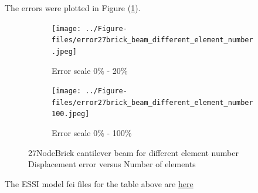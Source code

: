 \documentclass[fleqn,11pt]{article}
\begin{document}
The errors were plotted in Figure (\ref{fig error 27NodeBrick cantilever beam for different element number}).

\begin{figure}[H]
  \begin{subfigure}{0.5\textwidth}
    \centering
    \texttt{[image: ../Figure-files/error27brick\_beam\_different\_element\_number.jpeg]}
    \caption{Error scale 0\% - 20\%}
  \end{subfigure}
  \begin{subfigure}{0.5\textwidth}
    \centering
    \texttt{[image: ../Figure-files/error27brick\_beam\_different\_element\_number100.jpeg]}
    \caption{Error scale 0\% - 100\%}
  \end{subfigure}
  \captionsetup{justification=centering,margin=2cm}
  \caption{27NodeBrick cantilever beam for different element number\\
    Displacement error   versus   Number of elements}
  \label{fig error 27NodeBrick cantilever beam for different element number}
\end{figure}


The ESSI model fei files for the table above are \href{https://github.com/yuan-energy/ESSI_Verification/blob/master/27NodeBrick/cantilever_different_element_number/cantilever_different_element_number.tar.gz?raw=true}{here}





\end{document}
